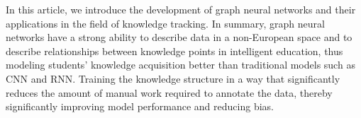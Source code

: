 \documentclass[a4paper,11pt]{article}
\begin{document}
In this article, we introduce the development of graph neural networks and their applications in the field of knowledge tracking. In summary, graph neural networks have a strong ability to describe data in a non-European space and to describe relationships between knowledge points in intelligent education, thus modeling students' knowledge acquisition better than traditional models such as CNN and RNN. Training the knowledge structure in a way that significantly reduces the amount of manual work required to annotate the data, thereby significantly improving model performance and reducing bias.





\clearpage


\end{document}
